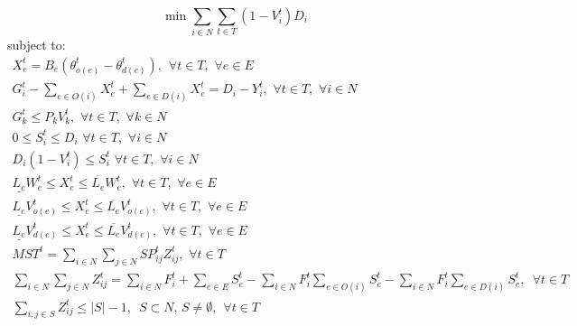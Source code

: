 \documentclass{article}
\begin{document}
	\begin{equation}
	\min \sum_{i \in N} \sum_{t \in T} (1-V_i^t)D_i
	\end{equation}
	subject to:
	\begin{eqnarray}
	X_e^t = B_e (\theta_{o(e)}^t - \theta_{d(e)}^t), \hspace{5pt} \forall t \in T, \hspace{4pt} \forall e \in E\\
	G_i^t - \sum_{e \in O(i)} X_e^t + \sum_{e \in D(i)} X_e^t = D_i-Y_i^t, \hspace{4pt} \forall t \in T, \hspace{4pt} \forall i \in N\\
	G_k^t \leq P_{k} V_{k}^t, \hspace{4pt} \forall t \in T, \hspace{4pt} \forall k \in N\\
	0\leq S_i^t \leq D_i \hspace{4pt} \forall t \in T, \hspace{4pt} \forall i \in N\\
	D_i (1-V_i^t) \leq S_i^t \hspace{4pt} \forall t \in T, \hspace{4pt} \forall i \in N\\
	\underline{L_e}W_{e}^t \leq X_{e}^t \leq \overline{L_e}W_{e}^t, \hspace{4pt} \forall t \in T, \hspace{4pt} \forall e \in E\\
	\underline{L_e}V_{o(e)}^t \leq X_{e}^t \leq \overline{L_e}V_{o(e)}^t, \hspace{4pt} \forall t \in T, \hspace{4pt} \forall e \in E\\
	\underline{L_e}V_{d(e)}^t \leq X_{e}^t \leq \overline{L_e}V_{d(e)}^t, \hspace{4pt} \forall t \in T, \hspace{4pt} \forall e \in E\\
	MST^t = \sum_{i \in N} \sum_{j \in N} SP_{ij}^t Z_{ij}^{t},  \hspace{4pt} \forall t \in T\\
	\sum_{i \in N} \sum_{j \in N} Z_{ij}^{t} = \sum_{i \in N} F_i^t + \sum_{e \in E} S_e^t - \sum_{i \in N} F_i^t \sum_{e \in O(i)} S_e^t - \sum_{i \in N} F_i^t \sum_{e \in D(i)} S_e^t, \hspace{6pt} \forall t \in T\\
	\sum_{i,j \in S} Z_{ij}^t \leq |S|-1, \hspace{6pt} S \subset N, \hspace{2pt} S \neq \emptyset, \hspace{5pt} \forall t\in T \\

\end{eqnarray}
\end{document}
